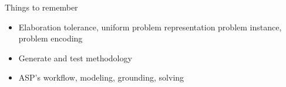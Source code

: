 \begin{frame}{Things to remember}
  \bigskip
  \begin{itemize}
  \item Elaboration tolerance, uniform problem representation
    problem instance, problem encoding
    \smallskip
  \item Generate and test methodology
    \smallskip
  \item ASP's workflow, modeling, grounding, solving
  \end{itemize}
\end{frame}
%
